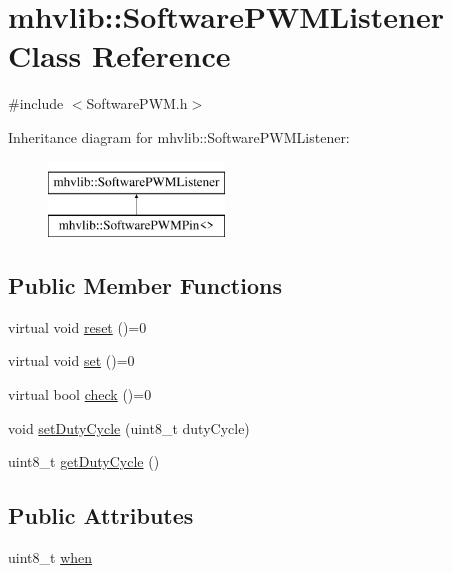 \hypertarget{classmhvlib_1_1_software_p_w_m_listener}{\section{mhvlib\-:\-:Software\-P\-W\-M\-Listener Class Reference}
\label{classmhvlib_1_1_software_p_w_m_listener}
}


{\ttfamily \#include $<$Software\-P\-W\-M.\-h$>$}

Inheritance diagram for mhvlib\-:\-:Software\-P\-W\-M\-Listener\-:\begin{figure}[H]
\begin{center}
\leavevmode
\includegraphics[height=2.000000cm]{classmhvlib_1_1_software_p_w_m_listener}
\end{center}
\end{figure}
\subsection*{Public Member Functions}
\begin{DoxyCompactItemize}
\item 
virtual void \hyperlink{classmhvlib_1_1_software_p_w_m_listener_ada9faf3b481a1076cef1766ea50fea57}{reset} ()=0
\item 
virtual void \hyperlink{classmhvlib_1_1_software_p_w_m_listener_a2c8a4c89b890fa1f70406183b2a4773f}{set} ()=0
\item 
virtual bool \hyperlink{classmhvlib_1_1_software_p_w_m_listener_a6fb78c32c30d506a6b6c72e14e6e9fd0}{check} ()=0
\item 
void \hyperlink{classmhvlib_1_1_software_p_w_m_listener_ad9a821985062d573b3d9d12c8e769975}{set\-Duty\-Cycle} (uint8\-\_\-t duty\-Cycle)
\item 
uint8\-\_\-t \hyperlink{classmhvlib_1_1_software_p_w_m_listener_abdf120ae478d8d9bc915b5379da09c62}{get\-Duty\-Cycle} ()
\end{DoxyCompactItemize}
\subsection*{Public Attributes}
\begin{DoxyCompactItemize}
\item 
uint8\-\_\-t \hyperlink{classmhvlib_1_1_software_p_w_m_listener_ac85d0da4b6a15ec400979461fc1ad919}{when}
\end{DoxyCompactItemize}


